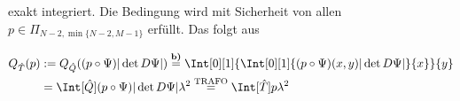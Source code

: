 \begin{solution}
\begin{enumerate}[label = \textbf{\alph*)}]
  exakt integriert. Die Bedingung wird mit Sicherheit von allen $p \in \Pi_{N-2,\min\{N-2,M-1\}}$
  erfüllt. Das folgt aus

  \begin{align*}
  Q_{\hat{T}}(p)
  &:=
  Q_{\hat{Q}}((p\circ \Psi) |\det D\Psi|)
  \stackrel{\textbf{b)}}{=}
  \Int[0][1]{
      \Int[0][1]{(p \circ \Psi)(x,y) |\det D\Psi|}{x}
            }{y} \\
  &=
  \Int[\hat{Q}]{(p \circ \Psi)|\det D\Psi|}{\lambda^2}
  \stackrel{\mathrm{TRAFO}}{=}
  \Int[\hat{T}]{p}{\lambda^2}
  \end{align*}
\end{enumerate}

\end{solution}

